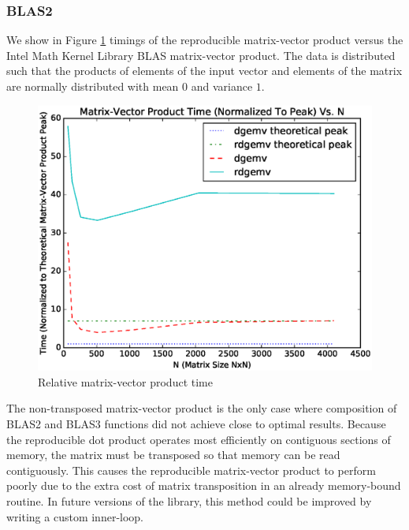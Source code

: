   \subsubsection{BLAS2}
    We show in Figure \ref{fig:gemv_timings} timings of the reproducible matrix-vector product versus the Intel Math Kernel Library \cite{MKL} BLAS matrix-vector product. The data is distributed such that the products of elements of the input vector and elements of the matrix are normally distributed with mean $0$ and variance $1$.
  \begin{figure}[H]
  \begin{center}
  \includegraphics[width=\textwidth]{plots/gemv_comparison}
  \caption{Relative matrix-vector product time}
  \label{fig:gemv_timings}
  \end{center}
  \end{figure}
  The non-transposed matrix-vector product is the only case where composition of BLAS2 and BLAS3 functions did not achieve close to optimal results. Because the reproducible dot product operates most efficiently on contiguous sections of memory, the matrix must be transposed so that memory can be read contiguously. This causes the reproducible matrix-vector product to perform poorly due to the extra cost of matrix transposition in an already memory-bound routine. In future versions of the library, this method could be improved by writing a custom inner-loop.

